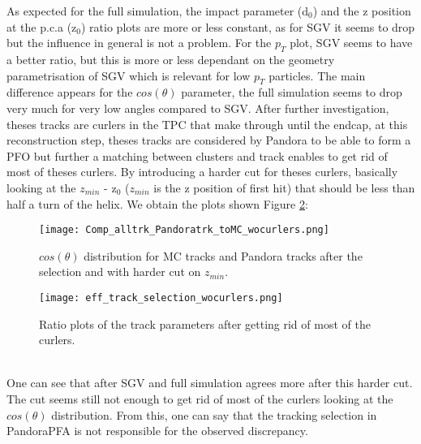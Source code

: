 \documentclass[a4paper,12pt]{article}
\begin{document}
As expected for the full simulation, the impact parameter (d$_0$) and the z position at the p.c.a (z$_0$) ratio plots are more or less constant, as for SGV it seems to drop but the influence in general is not a problem. For the $p_{T}$ plot, SGV seems to have a better ratio, but this is more or less dependant on the geometry parametrisation of SGV which is relevant for low $p_{T}$ particles. The main difference appears for the $cos(\theta)$ parameter, the full simulation seems to drop very much for very low angles compared to SGV. After further investigation, theses tracks are curlers in the TPC that make through until the endcap, at this reconstruction step, theses tracks are considered by Pandora to be able to form a PFO but further a matching between clusters and track enables to get rid of most of theses curlers. By introducing a harder cut for theses curlers, basically looking at the $z_{min}$ - z$_0$ ($z_{min}$ is the z position of first hit) that should be less than half a turn of the helix. We obtain the plots shown Figure \ref{fig:trk_select_wocurlers}:

\noindent
\begin{minipage}{\linewidth}
\centering
\begin{minipage}{0.4\linewidth}
\begin{figure}[H]
    \texttt{[image: Comp\_alltrk\_Pandoratrk\_toMC\_wocurlers.png]} 
 \caption{$cos(\theta)$ distribution for MC tracks and Pandora tracks after the selection and with harder cut on $z_{min}$.}
   \label{fig:trk_para_mc_reco}
\end{figure}
\end{minipage}
      \hspace{0.05\linewidth}
      \begin{minipage}{0.4\linewidth}
\begin{figure}[H]
    \texttt{[image: eff\_track\_selection\_wocurlers.png]} 
 \caption{Ratio plots of the track parameters after getting rid of most of the curlers.}
   \label{fig:trk_select_wocurlers}
\end{figure}
\end{minipage}
\end{minipage}\\[0.4cm]

\noindent
One can see that after SGV and full simulation agrees more after this harder cut. The cut seems still not enough to get rid of most of the curlers looking at the $cos(\theta)$ distribution. From this, one can say that the tracking selection in PandoraPFA is not responsible for the observed discrepancy. 
\end{document}
